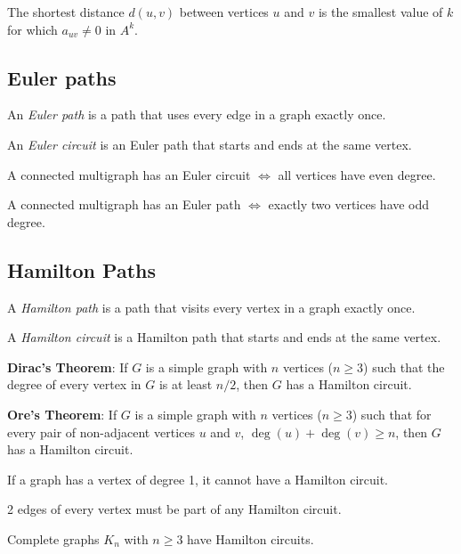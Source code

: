The shortest distance $d(u,v)$ between vertices $u$ and $v$ is the smallest value of $k$ for which $a_{uv} \ne 0$ in $A^k$.

\subsection{Euler paths}
An \emph{Euler path} is a path that uses every edge in a graph exactly once.

An \emph{Euler circuit} is an Euler path that starts and ends at the same vertex.

A connected multigraph has an Euler circuit $\iff$ all vertices have even degree.

A connected multigraph has an Euler path $\iff$ exactly two vertices have odd degree.

\subsection{Hamilton Paths}
A \emph{Hamilton path} is a path that visits every vertex in a graph exactly once.

A \emph{Hamilton circuit} is a Hamilton path that starts and ends at the same vertex.

\textbf{Dirac's Theorem}: If $G$ is a simple graph with $n$ vertices ($n \geq 3$) such that the degree of every vertex in $G$ is at least $n/2$, then $G$ has a Hamilton circuit.

\textbf{Ore's Theorem}: If $G$ is a simple graph with $n$ vertices ($n \geq 3$) such that for every pair of non-adjacent vertices $u$ and $v$, $\deg(u) + \deg(v) \geq n$, then $G$ has a Hamilton circuit.

If a graph has a vertex of degree 1, it cannot have a Hamilton circuit.

2 edges of every vertex must be part of any Hamilton circuit.

Complete graphs $K_n$ with $n \geq 3$ have Hamilton circuits.